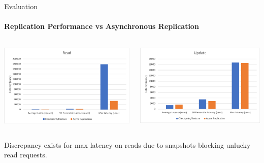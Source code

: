 \documentclass{beamer}
\begin{document}
\begin{frame}{Evaluation}
  \framesubtitle{Replication Performance vs Asynchronous Replication}

  \begin{columns}
    \includegraphics[scale=0.175]{../paper/async-replication-read}

    \includegraphics[scale=0.35]{../paper/async-replication-update}
  \end{columns}

  \hspace{1cm}

  \centering
  Discrepancy exists for max latency on reads due to snapshots blocking unlucky read requests.
\end{frame}
\end{document}
